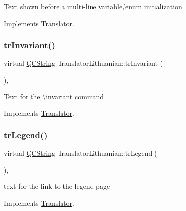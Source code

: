 Text shown before a multi-\/line variable/enum initialization 

Implements \mbox{\hyperlink{class_translator}{Translator}}.

\mbox{\label{class_translator_lithuanian_a80549952fe6414aa433813c89d411d23}} 
\subsubsection{\texorpdfstring{trInvariant()}{trInvariant()}}
{\footnotesize\ttfamily virtual \mbox{\hyperlink{class_q_c_string}{Q\+C\+String}} Translator\+Lithuanian\+::tr\+Invariant (\begin{DoxyParamCaption}{ }\end{DoxyParamCaption})\hspace{0.3cm}{\ttfamily [inline]}, {\ttfamily [virtual]}}

Text for the \textbackslash{}invariant command 

Implements \mbox{\hyperlink{class_translator}{Translator}}.

\mbox{\label{class_translator_lithuanian_a72ef0b9faeb0afd8391b16b75d9de453}} 
\subsubsection{\texorpdfstring{trLegend()}{trLegend()}}
{\footnotesize\ttfamily virtual \mbox{\hyperlink{class_q_c_string}{Q\+C\+String}} Translator\+Lithuanian\+::tr\+Legend (\begin{DoxyParamCaption}{ }\end{DoxyParamCaption})\hspace{0.3cm}{\ttfamily [inline]}, {\ttfamily [virtual]}}

text for the link to the legend page 

Implements \mbox{\hyperlink{class_translator}{Translator}}.

\mbox{\label{class_translator_lithuanian_a5cb7991cb1025b9fb505382d79d861e6}} 

